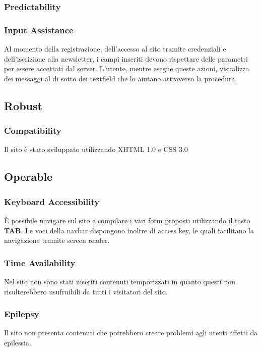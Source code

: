\documentclass[10pt, a4paper]{article}
\begin{document}
\subsubsection{Predictability}


\subsubsection{Input Assistance}
Al momento della registrazione, dell’accesso al sito tramite credenziali e dell’iscrizione alla newsletter, i campi inseriti devono rispettare delle parametri per essere accettati dal server. L’utente, mentre esegue queste azioni, visualizza dei messaggi al di sotto dei textfield che lo aiutano attraverso la procedura.

\subsection{Robust}

\subsubsection{Compatibility}
Il sito è stato sviluppato utilizzando XHTML 1.0 e CSS 3.0

\subsection{Operable}

\subsubsection{Keyboard Accessibility}
È possibile navigare sul sito e compilare i vari form proposti utilizzando il tasto \textbf{TAB}. Le voci della navbar dispongono inoltre di access key, le quali facilitano la navigazione tramite screen reader.

\subsubsection{Time Availability}
Nel sito non sono stati inseriti contenuti temporizzati in quanto questi non risulterebbero usufruibili da tutti i visitatori del sito.

\subsubsection{Epilepsy}
Il sito non presenta contenuti che potrebbero creare problemi agli utenti affetti da epilessia.
\end{document}
